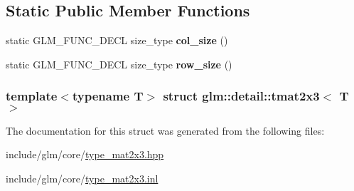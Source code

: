 \subsection*{\-Static \-Public \-Member \-Functions}
\begin{DoxyCompactItemize}
\item 
\hypertarget{structglm_1_1detail_1_1tmat2x3_a3f255a0208ab82afbc4276085a77fd2b}{static \-G\-L\-M\-\_\-\-F\-U\-N\-C\-\_\-\-D\-E\-C\-L size\-\_\-type {\bfseries col\-\_\-size} ()}\label{structglm_1_1detail_1_1tmat2x3_a3f255a0208ab82afbc4276085a77fd2b}

\item 
\hypertarget{structglm_1_1detail_1_1tmat2x3_ae17c25ed3c1da3eebed1416789601e95}{static \-G\-L\-M\-\_\-\-F\-U\-N\-C\-\_\-\-D\-E\-C\-L size\-\_\-type {\bfseries row\-\_\-size} ()}\label{structglm_1_1detail_1_1tmat2x3_ae17c25ed3c1da3eebed1416789601e95}

\end{DoxyCompactItemize}
\subsubsection*{template$<$typename \-T$>$ struct glm\-::detail\-::tmat2x3$<$ T $>$}



\-The documentation for this struct was generated from the following files\-:\begin{DoxyCompactItemize}
\item 
include/glm/core/\hyperlink{type__mat2x3_8hpp}{type\-\_\-mat2x3.\-hpp}\item 
include/glm/core/\hyperlink{type__mat2x3_8inl}{type\-\_\-mat2x3.\-inl}\end{DoxyCompactItemize}
